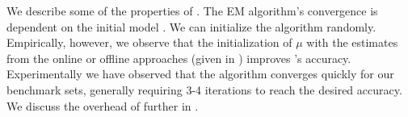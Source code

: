 We describe some of the properties of \SYSTEM{}. The EM algorithm's
convergence is dependent on the initial model
\cite{wu1983convergence}.  We can initialize the algorithm randomly.
Empirically, however, we observe that the initialization of $\mu$ with
the estimates from the online or offline approaches (given in
) improves \SYSTEM{}'s accuracy.  Experimentally we
have observed that the algorithm converges quickly for our benchmark
sets, generally requiring 3-4 iterations to reach the desired
accuracy. We discuss the overhead of \SYSTEM{} further in
. 


